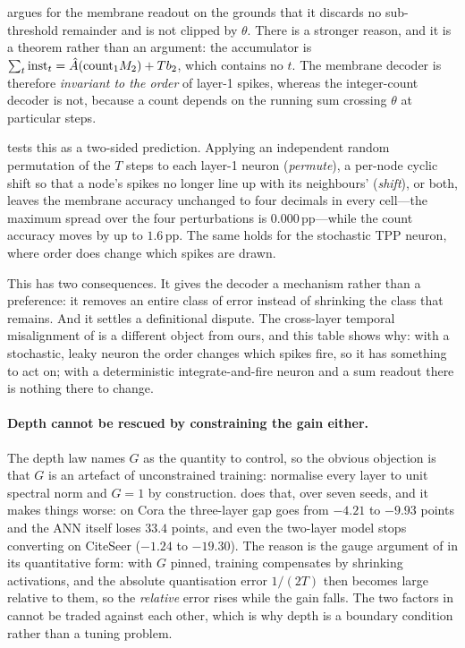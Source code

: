  argues for the membrane readout on the grounds that it discards no
sub-threshold remainder and is not clipped by $\theta$. There is a stronger reason, and it is a
theorem rather than an argument: the accumulator is
$\sum_{t}\mathrm{inst}_{t}=\hat{A}(\mathrm{count}_{1}M_{2})+Tb_{2}$, which contains no $t$.
The membrane decoder is therefore \emph{invariant to the order} of layer-1 spikes, whereas the
integer-count decoder is not, because a count depends on the running sum crossing $\theta$ at
particular steps.

 tests this as a two-sided prediction. Applying an independent random permutation
of the $T$ steps to each layer-1 neuron (\emph{permute}), a per-node cyclic shift so that a node's
spikes no longer line up with its neighbours' (\emph{shift}), or both, leaves the membrane accuracy
unchanged to four decimals in every cell---the maximum spread over the four perturbations is
$0.000$\,pp---while the count accuracy moves by up to $1.6$\,pp. The same holds for the stochastic
TPP neuron, where order does change which spikes are drawn.

This has two consequences. It gives the decoder a mechanism rather than a preference: it removes an
entire class of error instead of shrinking the class that remains. And it settles a definitional
dispute. The cross-layer temporal misalignment of \citet{bojkovic2025temporal} is a different object
from ours, and this table shows why: with a stochastic, leaky neuron the order changes which spikes
fire, so it has something to act on; with a deterministic integrate-and-fire neuron and a sum
readout there is nothing there to change.

\paragraph{Depth cannot be rescued by constraining the gain either.} The depth law names $G$ as the
quantity to control, so the obvious objection is that $G$ is an artefact of unconstrained training:
normalise every layer to unit spectral norm and $G=1$ by construction.  does
that, over seven seeds, and it makes things worse: on Cora the three-layer gap goes from $-4.21$ to
$-9.93$ points and the ANN itself loses $33.4$ points, and even the two-layer model stops converting
on CiteSeer ($-1.24$ to $-19.30$). The reason is the gauge argument of  in its
quantitative form: with $G$ pinned, training compensates by shrinking activations, and the absolute
quantisation error $1/(2T)$ then becomes large relative to them, so the \emph{relative} error rises
while the gain falls. The two factors in  cannot be traded against each other, which
is why depth is a boundary condition rather than a tuning problem.

